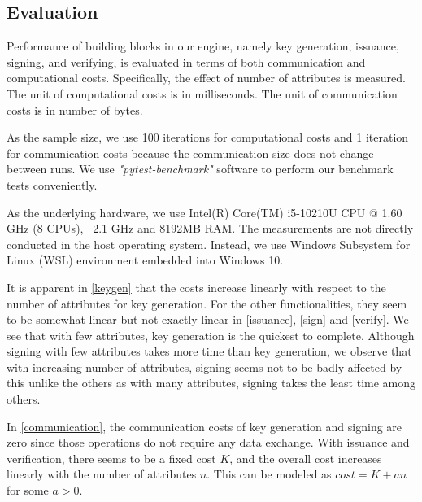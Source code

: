 \documentclass[9pt,conference]{IEEEtran}
\begin{document}
\subsection{Evaluation}
Performance of building blocks in our engine, namely key generation, issuance, signing, and verifying, is evaluated in terms of both communication and computational costs. Specifically, the effect of number of attributes is measured. The unit of computational costs is in milliseconds. The unit of communication costs is in number of bytes.

As the sample size, we use 100 iterations for computational costs and 1 iteration for communication costs because the communication size does not change between runs. We use \textit{"pytest-benchmark"}\cite{pytestbenchmark} software to perform our benchmark tests conveniently.

As the underlying hardware, we use Intel(R) Core(TM) i5-10210U CPU @ 1.60 GHz (8 CPUs), ~2.1 GHz and 8192MB RAM. The measurements are not directly conducted in the host operating system. Instead, we use Windows Subsystem for Linux (WSL) environment embedded into Windows 10.

It is apparent in \autoref{keygen} that the costs increase linearly with respect to the number of attributes for key generation. For the other functionalities, they seem to be somewhat linear but not exactly linear in \autoref{issuance}, \autoref{sign} and \autoref{verify}. We see that with few attributes, key generation is the quickest to complete. Although signing with few attributes takes more time than key generation, we observe that with increasing number of attributes, signing seems not to be badly affected by this unlike the others as with many attributes, signing takes the least time among others.

In \autoref{communication}, the communication costs of key generation and signing are zero since those operations do not require any data exchange. With issuance and verification, there seems to be a fixed cost $K$, and the overall cost increases linearly with the number of attributes $n$. This can be modeled as $cost=K+an$ for some $a>0$.
\end{document}
